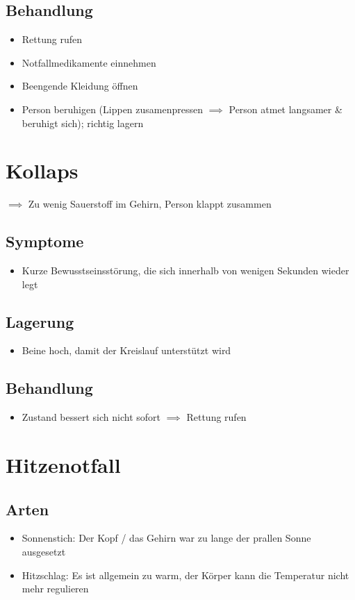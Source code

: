 \section*{Behandlung}
\begin{itemize}
    \item Rettung rufen
    \item Notfallmedikamente einnehmen
    \item Beengende Kleidung öffnen
    \item Person beruhigen (Lippen zusamenpressen $\implies$ Person atmet langsamer \& beruhigt sich); richtig lagern
\end{itemize}

\chapter{Kollaps}
$\implies$ Zu wenig Sauerstoff im Gehirn, Person klappt zusammen

\section*{Symptome}
\begin{itemize}
    \item Kurze Bewusstseinsstörung, die sich innerhalb von wenigen Sekunden wieder legt
\end{itemize}

\section*{Lagerung}
\begin{itemize}
    \item Beine hoch, damit der Kreislauf unterstützt wird
\end{itemize}

\section*{Behandlung}
\begin{itemize}
    \item Zustand bessert sich nicht sofort $\implies$ Rettung rufen
\end{itemize}

\chapter{Hitzenotfall}

\section*{Arten}
\begin{itemize}
    \item Sonnenstich: Der Kopf / das Gehirn war zu lange der prallen Sonne ausgesetzt
    \item Hitzschlag: Es ist allgemein zu warm, der Körper kann die Temperatur nicht mehr regulieren
\end{itemize}

